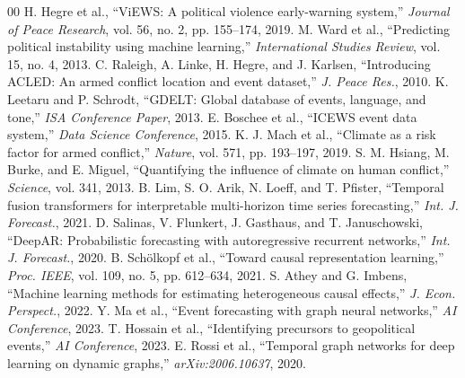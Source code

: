 \documentclass[conference]{IEEEtran}
\begin{document}
\begin{thebibliography}{00}
 H. Hegre et al., ``ViEWS: A political violence early-warning system,'' \emph{Journal of Peace Research}, vol. 56, no. 2, pp. 155--174, 2019.
 M. Ward et al., ``Predicting political instability using machine learning,'' \emph{International Studies Review}, vol. 15, no. 4, 2013.
 C. Raleigh, A. Linke, H. Hegre, and J. Karlsen, ``Introducing ACLED: An armed conflict location and event dataset,'' \emph{J. Peace Res.}, 2010.
 K. Leetaru and P. Schrodt, ``GDELT: Global database of events, language, and tone,'' \emph{ISA Conference Paper}, 2013.
 E. Boschee et al., ``ICEWS event data system,'' \emph{Data Science Conference}, 2015.
 K. J. Mach et al., ``Climate as a risk factor for armed conflict,'' \emph{Nature}, vol. 571, pp. 193--197, 2019.
 S. M. Hsiang, M. Burke, and E. Miguel, ``Quantifying the influence of climate on human conflict,'' \emph{Science}, vol. 341, 2013.
 B. Lim, S. O. Arik, N. Loeff, and T. Pfister, ``Temporal fusion transformers for interpretable multi-horizon time series forecasting,'' \emph{Int. J. Forecast.}, 2021.
 D. Salinas, V. Flunkert, J. Gasthaus, and T. Januschowski, ``DeepAR: Probabilistic forecasting with autoregressive recurrent networks,'' \emph{Int. J. Forecast.}, 2020.
 B. Schölkopf et al., ``Toward causal representation learning,'' \emph{Proc. IEEE}, vol. 109, no. 5, pp. 612--634, 2021.
 S. Athey and G. Imbens, ``Machine learning methods for estimating heterogeneous causal effects,'' \emph{J. Econ. Perspect.}, 2022.
 Y. Ma et al., ``Event forecasting with graph neural networks,'' \emph{AI Conference}, 2023.
 T. Hossain et al., ``Identifying precursors to geopolitical events,'' \emph{AI Conference}, 2023.
 E. Rossi et al., ``Temporal graph networks for deep learning on dynamic graphs,'' \emph{arXiv:2006.10637}, 2020.
\end{thebibliography}
\end{document}
